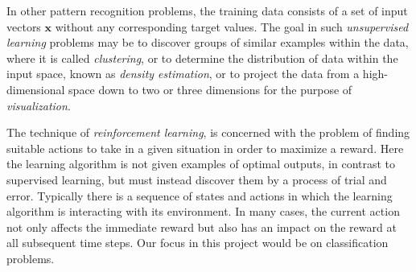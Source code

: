 \documentclass[12pt]{report}
\numberwithin{equation}{section}
\begin{document}
In other pattern recognition problems, the training data consists of a set of input vectors $\bm{x}$ without any corresponding target values. The goal in such \textit{unsupervised learning} problems may be to discover groups of similar examples within the data, where it is called \textit{clustering}, or to determine the distribution of data within the input space, known as \textit{density estimation}, or to project the data from a high-dimensional space down to two or three dimensions for the purpose of \textit{visualization}. 

The technique of \textit{reinforcement learning}, \textbf{\cite{Sutton:1998:IRL:551283}} is concerned with the problem of finding suitable actions to take in a given situation in order to maximize a reward. Here the learning algorithm is not given examples of optimal outputs, in contrast to supervised learning, but must instead discover them by a process of trial and error. Typically there is a sequence of states and actions in which the learning algorithm is interacting with its environment. In many cases, the current action not only affects the immediate reward but also has an impact on the reward at all subsequent time steps. Our focus in this project would be on classification problems.
\end{document}
